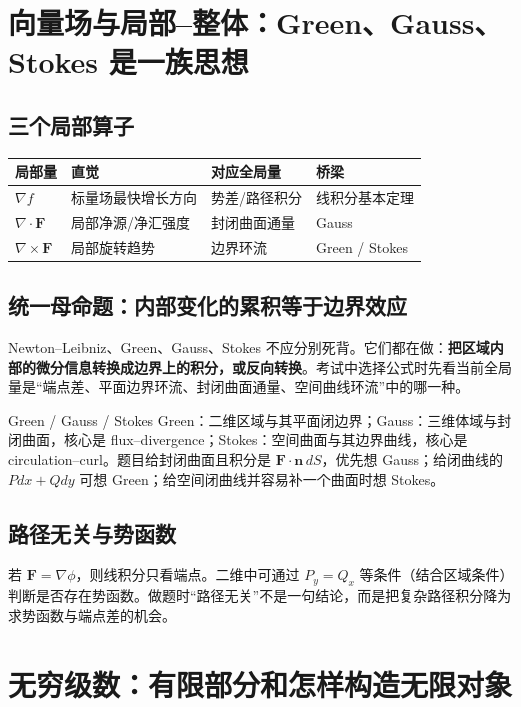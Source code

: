 \documentclass[11pt,a4paper,openany]{ctexbook}
\newcommand{\key}[1]{\textbf{\color{deep}#1}}\newcommand{\eng}[1]{\textit{#1}}\let\cleardoublepage\clearpage
\begin{document}
\chapter{向量场与局部--整体：Green、Gauss、Stokes 是一族思想}
\section{三个局部算子}
\begin{longtable}{L{2.6cm}L{4.2cm}L{4.0cm}L{\dimexpr\linewidth-12.07cm\relax}}
\toprule\textbf{局部量}&\textbf{直觉}&\textbf{对应全局量}&\textbf{桥梁}\\\midrule
$\nabla f$ & 标量场最快增长方向 & 势差/路径积分 & 线积分基本定理\\
$\nabla\cdot\bm F$ & 局部净源/净汇强度 & 封闭曲面通量 & Gauss\\
$\nabla\times\bm F$ & 局部旋转趋势 & 边界环流 & Green / Stokes\\
\bottomrule\end{longtable}

\section{统一母命题：内部变化的累积等于边界效应}
Newton--Leibniz、Green、Gauss、Stokes 不应分别死背。它们都在做：\key{把区域内部的微分信息转换成边界上的积分，或反向转换}。考试中选择公式时先看当前全局量是“端点差、平面边界环流、封闭曲面通量、空间曲线环流”中的哪一种。

\begin{boundarybox}{Green / Gauss / Stokes}
Green：二维区域与其平面闭边界；Gauss：三维体域与封闭曲面，核心是 flux--divergence；Stokes：空间曲面与其边界曲线，核心是 circulation--curl。题目给封闭曲面且积分是 $\bm F\cdot\bm n\,dS$，优先想 Gauss；给闭曲线的 $Pdx+Qdy$ 可想 Green；给空间闭曲线并容易补一个曲面时想 Stokes。
\end{boundarybox}

\section{路径无关与势函数}
若 $\bm F=\nabla\phi$，则线积分只看端点。二维中可通过 $P_y=Q_x$ 等条件（结合区域条件）判断是否存在势函数。做题时“路径无关”不是一句结论，而是把复杂路径积分降为求势函数与端点差的机会。

\chapter{无穷级数：有限部分和怎样构造无限对象}
\end{document}
